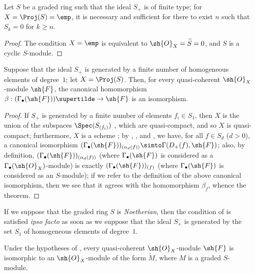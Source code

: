 \begin{corollary}[2.7.4]
\label{II.2.7.4}
Let $S$ be a graded ring such that the ideal $S_+$ is of finite type;
for $X=\Proj(S)=\emp$, it is necessary and sufficient for there to exist $n$ such that $S_k=0$ for $k\geq n$.
\end{corollary}

\begin{proof}
The condition $X=\emp$ is equivalent to $\sh{O}_X=\widetilde{S}=0$, and $S$ is a cyclic $S$-module.
\end{proof}

\begin{theorem}[2.7.5]
\label{II.2.7.5}
Suppose that the ideal $S_+$ is generated by a finite number of homogeneous elements of degree~$1$;
let $X=\Proj(S)$.
Then, for every quasi-coherent $\sh{O}_X$-module $\sh{F}$, the canonical homomorphism $\beta:(\Gamma_\bullet(\sh{F}))\supertilde\to\sh{F}$  is an isomorphism.
\end{theorem}

\begin{proof}
If $S_+$ is generated by a finite number of elements $f_i\in S_1$, then $X$ is the union of the subspaces $\Spec(S_{(f_i)})$ , which are quasi-compact, and so $X$ is quasi-compact;
furthermore, $X$ is a scheme ;
by , , and , we have, for all $f\in S_d$ ($d>0$), a canonical isomorphism $(\Gamma_\bullet(\sh{F}))_{(\alpha_d(f))}\simto\Gamma(D_+(f),\sh{F})$;
also, by definition, $(\Gamma_\bullet(\sh{F}))_{(\alpha_d(f))}$ (where $\Gamma_\bullet(\sh{F})$ is considered as a $\Gamma_\bullet(\sh{O}_X)$-module) is exactly $(\Gamma_\bullet(\sh{F}))_{(f)}$ (where $\Gamma_\bullet(\sh{F})$ is considered as an $S$-module);
if we refer to the definition  of the above canonical isomorphism, then we see that it agrees with the homomorphism $\beta_f$, whence the theorem.
\end{proof}

\begin{remark}[2.7.6]
\label{II.2.7.6}
If we suppose that the graded ring $S$ is \emph{Noetherian}, then the condition of  is satisfied \emph{ipso facto} as soon as we suppose that the ideal $S_+$ is generated by the set $S_1$ of homogeneous elements of degree~$1$.
\end{remark}

\begin{corollary}[2.7.7]
\label{II.2.7.7}
Under the hypotheses of , every quasi-coherent $\sh{O}_X$-module $\sh{F}$ is isomorphic to an $\sh{O}_X$-module of the form $\widetilde{M}$, where $M$ is a graded $S$-module.
\end{corollary}

